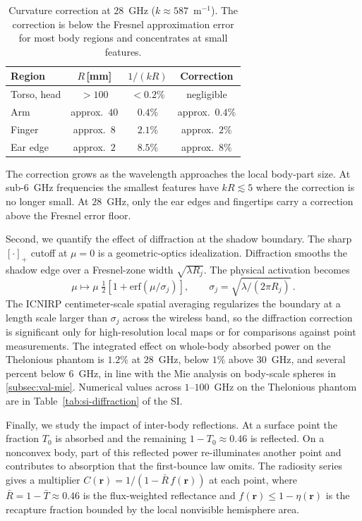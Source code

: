 \documentclass[journal,twocolumn,10pt]{IEEEtran}
\theoremstyle{plain}
\newcommand{\rr}{\mathbf{r}}
\newcommand{\Tbar}{\bar{T}}
\begin{document}
\begin{table}[!t]
\centering
\caption{Curvature correction at $28$~GHz ($k \approx 587$~m$^{-1}$).
The correction is below the Fresnel approximation error for most
body regions and concentrates at small features.}
\label{tab:curv-mag}
\begin{tabular}{lccc}
\toprule
Region & $R$\,[mm] & $1/(kR)$ & Correction \\
\midrule
Torso, head & $> 100$ & $< 0.2\%$ & negligible \\
Arm         & approx.\ $40$ & $0.4\%$ & approx.\ $0.4\%$ \\
Finger      & approx.\ $8$  & $2.1\%$ & approx.\ $2\%$ \\
Ear edge    & approx.\ $2$  & $8.5\%$ & approx.\ $8\%$ \\
\bottomrule
\end{tabular}
\end{table}

The correction grows as the wavelength approaches the local
body-part size. At sub-$6$~GHz frequencies the smallest features
have $kR \lesssim 5$ where the correction is no longer small. At
$28$~GHz, only the ear edges and fingertips carry a correction
above the Fresnel error floor.

Second, we quantify the effect of diffraction at the shadow boundary.
The sharp $[\cdot]_+$ cutoff at $\mu = 0$ is a geometric-optics
idealization. Diffraction smooths the shadow edge over a Fresnel-zone
width $\sqrt{\lambda R_j}$. The physical activation becomes
\begin{equation}\label{eq:gelu}
  \mu \mapsto \mu\;\tfrac{1}{2}\!\left[1 + \mathrm{erf}(\mu/\sigma_j)\right],
  \qquad \sigma_j = \sqrt{\lambda / (2\pi R_j)}\, .
\end{equation}
The \gls{ICNIRP} centimeter-scale spatial
averaging regularizes the boundary at a length scale larger
than $\sigma_j$ across the wireless band, so the diffraction
correction is significant only for high-resolution local maps or
for comparisons against point measurements. The integrated effect on
whole-body absorbed power on the Thelonious phantom is $1.2\%$ at
$28$~GHz, below $1\%$ above $30$~GHz, and several percent below
$6$~GHz, in line with the Mie analysis on body-scale spheres in
\cref{subsec:val-mie}. Numerical values across $1$--$100$~GHz on
the Thelonious phantom are in Table~\ref{tab:si-diffraction} of the SI.

Finally, we study the impact of inter-body reflections. At a surface
point the fraction $T_0$ is absorbed and the remaining
$1 - T_0 \approx 0.46$ is reflected. On a nonconvex body, part of
this reflected power re-illuminates another point and contributes
to absorption that the first-bounce law omits. The radiosity series
gives a multiplier $C(\rr) = 1/(1 - \bar{R}\,f(\rr))$ at each point,
where $\bar{R} = 1 - \Tbar \approx 0.46$ is the flux-weighted
reflectance and $f(\rr) \le 1 - \eta(\rr)$ is the recapture fraction
bounded by the local nonvisible hemisphere area.
\end{document}
